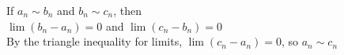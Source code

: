 \documentclass[preview]{standalone}
\begin{document}
\begin{center}
If $a_n \sim b_n$ and $b_n \sim c_n$, then\\$\lim (b_n - a_n) = 0$ and $\lim (c_n - b_n) = 0$\\By the triangle inequality for limits, $\lim (c_n - a_n) = 0$, so $a_n \sim c_n$
\end{center}
\end{document}
